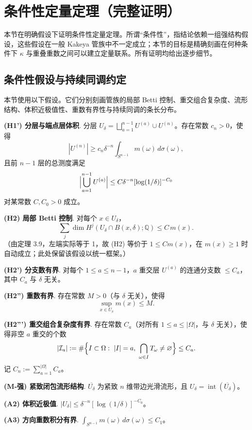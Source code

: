 \documentclass[11pt,a4paper]{article}
\theoremstyle{remark}
\begin{document}
	\section{条件性定量定理（完整证明）}
	\label{sec:cond}
	本节在明确假设下证明条件性定量定理。所谓“条件性”，指结论依赖一组强结构假设，这些假设在一般 Kakeya 管族中不一定成立；本节的目标是精确刻画在何种条件下 $\kappa$ 与重叠重数之间可以建立定量联系。所有证明均给出逐步细节。
	
	\subsection{条件性假设与持续同调约定}
	本节使用以下假设。它们分别刻画管族的局部 Betti 控制、重交组合复杂度、流形结构、体积近极值性、重数有界性与持续同调的条长分布。
	
	\noindent\textbf{(H1') 分层与端点层体积}. 分层 $U_\delta=\bigsqcup_{a=1}^{n-1}U^{(a)}\cup U^{(n)}$。存在常数 $c_n>0$，使得
	\[
	|U^{(n)}|\ge c_n\delta^{-n}\int_{S^{n-1}}m(\omega)\,d\sigma(\omega),
	\]
	且前 $n-1$ 层的总测度满足
	\[
	\Bigl|\bigcup_{a=1}^{n-1}U^{(a)}\Bigr|\le C\delta^{-n}[\log(1/\delta)]^{-C_0}
	\]
	对某常数 $C,C_0>0$ 成立。
	
	\noindent\textbf{(H2) 局部 Betti 控制}. 对每个 $x\in U_\delta$，
	\[
	\sum_{j}\dim H^j(U_\delta\cap B(x,\delta);\mathbb Q)\le C\,m(x).
	\]
	（由定理 3.9，左端实际等于 1，故 (H2) 等价于 $1\le Cm(x)$，在 $m(x)\ge1$ 时自动成立；此处保留该假设以统一框架。）
	
	\noindent\textbf{(H2') 分支数有界}. 对每个 $1\le a\le n-1$，$a$ 重交层 $U^{(a)}$ 的连通分支数 $\le C_a$，其中 $C_a$ 与 $\delta$ 无关。
	
	\noindent\textbf{(H2'') 重数有界}. 存在常数 $M>0$（与 $\delta$ 无关），使得
	\[
	\sup_{x\in U_\delta}m(x)\le M.
	\]
	
	\noindent\textbf{(H2''') 重交组合复杂度有界}. 存在常数 $C_a$（对所有 $1\le a\le|\Omega|$，与 $\delta$ 无关），使得非空 $a$ 重交的个数
	\[
	|\mathcal I_a|:=\#\Bigl\{I\subset\Omega:\ |I|=a,\ \bigcap_{\omega\in I}T_\omega\neq\varnothing\Bigr\}\le C_a.
	\]
	记 $C_n:=\sum_{a=1}^{|\Omega|}C_a$。
	
	\noindent\textbf{(M‑强) 紧致闭包流形结构}. $\overline{U_\delta}$ 为紧致 $n$ 维带边光滑流形，且 $U_\delta=\operatorname{int}(\overline{U_\delta})$。
	
	\noindent\textbf{(A2) 体积近极值}. $|U_\delta|\le\delta^{-n}[\log(1/\delta)]^{-C_0}$。
	
	\noindent\textbf{(A3) 方向重数积分有界}. $\int_{S^{n-1}}m(\omega)\,d\sigma(\omega)\le C_1$。
	
\end{document}
